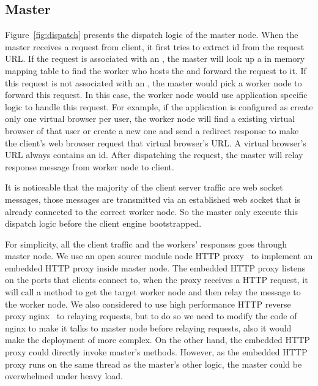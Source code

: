 \newarchitectureoverview{}




\subsection{Master}
Figure~\ref{fig:dispatch} presents the dispatch logic of the master node.
When the master receives a request from client,
it first tries to extract \appins{} id from the request URL.
If the request is associated with an \appins{},
the master will look up a in memory mapping table to find the worker
who hosts the \appins{} and forward the request to it.
If this request is not associated with an \appins{},
the master would pick a worker node to forward this request.
In this case, the worker node would use application specific logic to handle this request.
For example, if the application is configured as create only one virtual browser per user,
the worker node will find a existing virtual browser of that user or create a new one
and send a redirect response to make the client's web browser request that virtual browser's URL.
A virtual browser's URL always contains an \appins{} id.
After dispatching the request,
the master will relay response message from worker node to client.

It is noticeable that the majority of the client server traffic are web socket messages,
those messages are transmitted via an established web socket that is already connected to the 
correct worker node.
So the master only execute this dispatch logic before the client engine bootstrapped.

For simplicity, all the client traffic and the workers' responses goes through master node.
We use an open source \nodejs{} module node HTTP proxy~\cite{nodeproxy} to implement
an embedded HTTP proxy inside master node.
The embedded HTTP proxy listens on the ports that clients connect to,
when the proxy receives a HTTP request,
it will call a method to get the target worker node and then relay the message
to the worker node.
We also considered to use high performance HTTP reverse proxy nginx~\cite{nginx}
to relaying requests,
but to do so we need to modify the code of nginx to 
make it talks to master node before relaying requests,
also it would make the deployment of \cb{} more complex.
On the other hand, the embedded HTTP proxy could directly invoke master's methods.
However, as the embedded HTTP proxy runs on the same thread as the master's other
logic, the master could be overwhelmed under heavy load.


